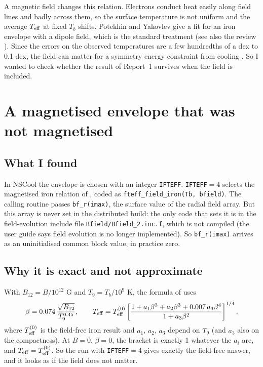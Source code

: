 \documentclass[11pt,a4paper]{article}
\newcommand{\Teff}{T_{\rm eff}}
\begin{document}
A magnetic field changes this relation. Electrons conduct heat easily along field lines and badly across them, so the surface temperature is not uniform and the average $\Teff$ at fixed $T_b$ shifts. Potekhin and Yakovlev \cite{PY2001} give a fit for an iron envelope with a dipole field, which is the standard treatment (see also the review \cite{PotekhinPonsPage2015}). Since the errors on the observed temperatures are a few hundredths of a dex to 0.1 dex, the field can matter for a symmetry energy constraint from cooling \cite{Sarkar2023}. So I wanted to check whether the result of Report~1 survives when the field is included.

\section{A magnetised envelope that was not magnetised}\label{sec:bug}
\subsection{What I found}
In NSCool the envelope is chosen with an integer \texttt{IFTEFF}. \texttt{IFTEFF}$=4$ selects the magnetised iron relation of \cite{PY2001}, coded as \texttt{fteff\_field\_iron(Tb, bfield)}. The calling routine passes \texttt{bf\_r(imax)}, the surface value of the radial field array. But this array is never set in the distributed build: the only code that sets it is in the field-evolution include file \texttt{Bfield/Bfield\_2.inc.f}, which is not compiled (the user guide says field evolution is no longer implemented). So \texttt{bf\_r(imax)} arrives as an uninitialised common block value, in practice zero.

\subsection{Why it is exact and not approximate}
With $B_{12}=B/10^{12}$ G and $T_9=T_b/10^9$ K, the formula of \cite{PY2001} uses
\begin{equation}
\beta = 0.074\,\frac{\sqrt{B_{12}}}{T_9^{0.45}},\qquad
\Teff = \Teff^{(0)}\left[\frac{1+a_1\beta^2+a_2\beta^3+0.007\,a_3\beta^4}{1+a_3\beta^2}\right]^{1/4},
\end{equation}
where $\Teff^{(0)}$ is the field-free iron result and $a_1$, $a_2$, $a_3$ depend on $T_9$ (and $a_3$ also on the compactness). At $B=0$, $\beta=0$, the bracket is exactly 1 whatever the $a_i$ are, and $\Teff=\Teff^{(0)}$. So the run with \texttt{IFTEFF}$=4$ gives exactly the field-free answer, and it looks as if the field does not matter.
\end{document}
